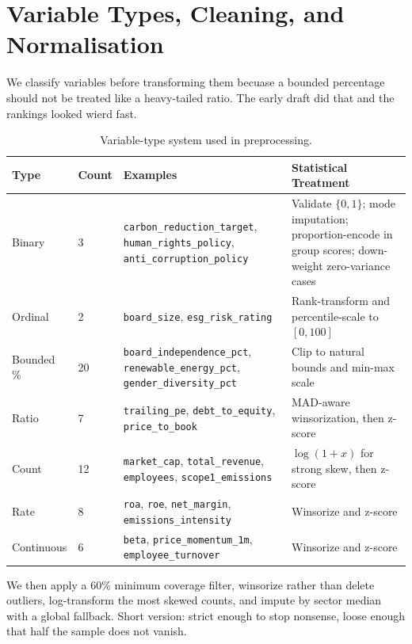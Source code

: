 \section{Variable Types, Cleaning, and Normalisation}
\label{sec:var_types}
We classify variables before transforming them becuase a bounded percentage should not be treated like a heavy-tailed ratio. The early draft did that and the rankings looked wierd fast.
\begin{table}[!htbp]
\centering
\caption{Variable-type system used in preprocessing.}\label{tab:ch3_vartypes}\small
\begin{tabular}{@{}llp{3.6cm}p{5.2cm}@{}}
\toprule
\textbf{Type} & \textbf{Count} & \textbf{Examples} & \textbf{Statistical Treatment} \\
\midrule
Binary & 3 & \texttt{carbon\_reduction\_target}, \texttt{human\_rights\_policy}, \texttt{anti\_corruption\_policy} & Validate $\{0,1\}$; mode imputation; proportion-encode in group scores; down-weight zero-variance cases \\
Ordinal & 2 & \texttt{board\_size}, \texttt{esg\_risk\_rating} & Rank-transform and percentile-scale to $[0,100]$ \\
Bounded \% & 20 & \texttt{board\_independence\_pct}, \texttt{renewable\_energy\_pct}, \texttt{gender\_diversity\_pct} & Clip to natural bounds and min-max scale \\
Ratio & 7 & \texttt{trailing\_pe}, \texttt{debt\_to\_equity}, \texttt{price\_to\_book} & MAD-aware winsorization, then z-score \\
Count & 12 & \texttt{market\_cap}, \texttt{total\_revenue}, \texttt{employees}, \texttt{scope1\_emissions} & $\log(1+x)$ for strong skew, then z-score \\
Rate & 8 & \texttt{roa}, \texttt{roe}, \texttt{net\_margin}, \texttt{emissions\_intensity} & Winsorize and z-score \\
Continuous & 6 & \texttt{beta}, \texttt{price\_momentum\_1m}, \texttt{employee\_turnover} & Winsorize and z-score \\
\bottomrule
\end{tabular}
\end{table}
We then apply a 60\% minimum coverage filter, winsorize rather than delete outliers, log-transform the most skewed counts, and impute by sector median with a global fallback. Short version: strict enough to stop nonsense, loose enough that half the sample does not vanish.

